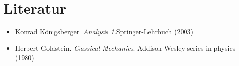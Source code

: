 \documentclass[reprint,aps,nofootinbib,10pt,a4paper]{revtex4-1}
\begin{document}
	
	
	
	
	
	\appendix
	
	\section*{Literatur}
	\begin{itemize}

	\item	Konrad K{\"o}nigsberger. \textit{Analysis 1}.Springer-Lehrbuch (2003)

	\item Herbert Goldstein. \textit{Classical Mechanics}. Addison-Wesley series in physics (1980)
	\end{itemize}
\end{document}
